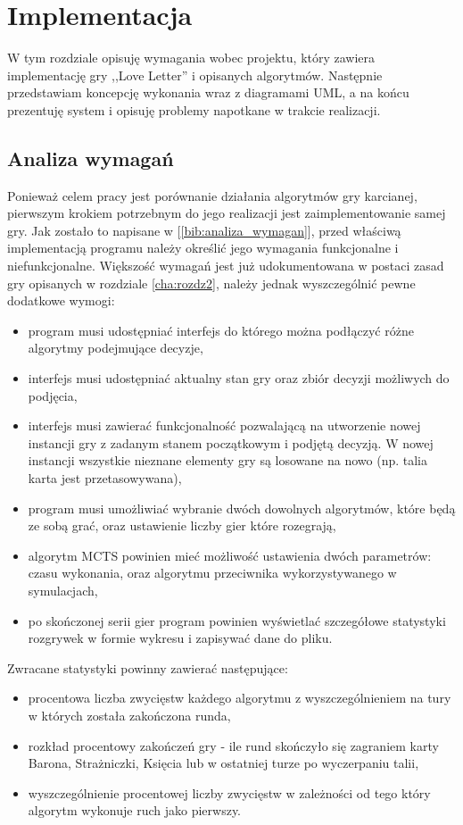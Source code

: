 \chapter{Implementacja}
\label{cha:rozdz4}

W tym rozdziale opisuję wymagania wobec projektu, który zawiera implementację gry ,,Love Letter'' i opisanych algorytmów. Następnie przedstawiam koncepcję wykonania wraz z diagramami UML, a na końcu prezentuję system i opisuję problemy napotkane w trakcie realizacji.

\section{Analiza wymagań}
Ponieważ celem pracy jest porównanie działania algorytmów gry karcianej, pierwszym krokiem potrzebnym do jego realizacji jest zaimplementowanie samej gry. Jak zostało to napisane w [\ref{bib:analiza_wymagan}], przed właściwą implementacją programu należy określić jego wymagania funkcjonalne i niefunkcjonalne. Większość wymagań jest już udokumentowana w postaci zasad gry opisanych w rozdziale \ref{cha:rozdz2}, należy jednak wyszczególnić pewne dodatkowe wymogi:
\begin{itemize}
	\item program musi udostępniać interfejs do którego można podłączyć różne algorytmy podejmujące decyzje,
	\item interfejs musi udostępniać aktualny stan gry oraz zbiór decyzji możliwych do podjęcia,
	\item interfejs musi zawierać funkcjonalność pozwalającą na utworzenie nowej instancji gry z zadanym stanem początkowym i podjętą decyzją. W nowej instancji wszystkie nieznane elementy gry są losowane na nowo (np. talia karta jest przetasowywana),
	\item program musi umożliwiać wybranie dwóch dowolnych algorytmów, które będą ze sobą grać, oraz ustawienie liczby gier które rozegrają,
	\item algorytm MCTS powinien mieć możliwość ustawienia dwóch parametrów: czasu wykonania, oraz algorytmu przeciwnika wykorzystywanego w symulacjach,
	\item po skończonej serii gier program powinien wyświetlać szczegółowe statystyki rozgrywek w formie wykresu i zapisywać dane do pliku.
\end{itemize}
Zwracane statystyki powinny zawierać następujące:
\begin{itemize}
	\item procentowa liczba zwycięstw każdego algorytmu z wyszczególnieniem na tury w których została zakończona runda,
	\item rozkład procentowy zakończeń gry - ile rund skończyło się zagraniem karty Barona, Strażniczki, Księcia lub w ostatniej turze po wyczerpaniu talii,
	\item wyszczególnienie procentowej liczby zwycięstw w zależności od tego który algorytm wykonuje ruch jako pierwszy.
\end{itemize}

